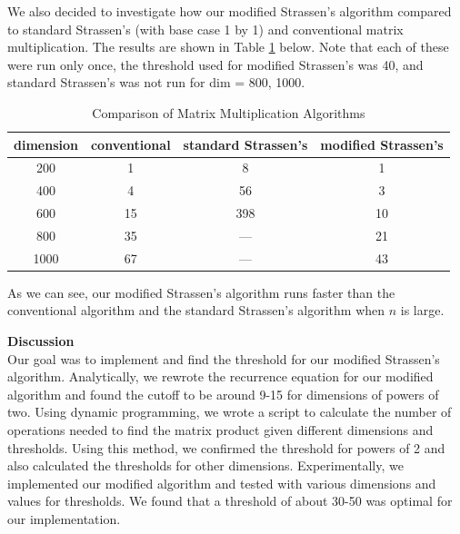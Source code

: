 \documentclass[12pt]{article}
\begin{document}
We also decided to investigate how our modified Strassen's algorithm compared to standard Strassen's (with base case 1 by 1) and conventional matrix multiplication. The results are shown in Table \ref{table:comp} below. Note that each of these were run only once, the threshold used for modified Strassen's was 40, and standard Strassen's was not run for dim = 800, 1000. \\

\begin{table}[h]
\centering
{\setlength{\tabcolsep}{10pt}
\begin{tabular}{c|c|c|c}
dimension & conventional & standard Strassen's & modified Strassen's \\\hline
200 & \cellcolor{green}1 & 8 & \cellcolor{green}1 \\
400 & 4 & 56 & \cellcolor{green}3 \\
600 & 15 & 398 & \cellcolor{green}10 \\
800 & 35 & --- & \cellcolor{green}21 \\
1000 & 67 & --- & \cellcolor{green}43 \\
\end{tabular}}
\caption{Comparison of Matrix Multiplication Algorithms}
\label{table:comp}
\end{table}

As we can see, our modified Strassen's algorithm runs faster than the conventional algorithm and the standard Strassen's algorithm when $n$ is large. \\

\bigskip

\pagebreak

\textbf{Discussion} \\
Our goal was to implement and find the threshold for our modified Strassen's algorithm. Analytically, we rewrote the recurrence equation for our modified algorithm and found the cutoff to be around 9-15 for dimensions of powers of two. Using dynamic programming, we wrote a script to calculate the number of operations needed to find the matrix product given different dimensions and thresholds. Using this method, we confirmed the threshold for powers of 2 and also calculated the thresholds for other dimensions. Experimentally, we implemented our modified algorithm and tested with various dimensions and values for thresholds. We found that a threshold of about 30-50 was optimal for our implementation. \\
\end{document}
